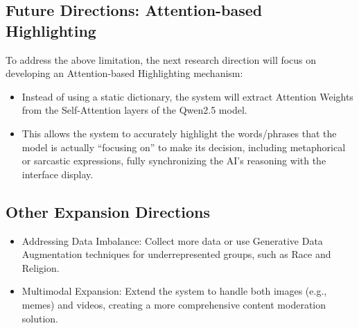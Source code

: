 \documentclass[11pt]{article}
\begin{document}
\subsection{Future Directions: Attention-based Highlighting}
To address the above limitation, the next research direction will focus on developing an
Attention-based Highlighting mechanism:
\begin{itemize}[leftmargin=*]
\item Instead of using a static dictionary, the system will extract Attention Weights from the
Self-Attention layers of the Qwen2.5 model.
\item This allows the system to accurately highlight the words/phrases that the model is
actually ``focusing on'' to make its decision, including metaphorical or sarcastic
expressions, fully synchronizing the AI's reasoning with the interface display.
\end{itemize}

\subsection{Other Expansion Directions}
\begin{itemize}[leftmargin=*]
\item Addressing Data Imbalance: Collect more data or use Generative Data
Augmentation techniques for underrepresented groups, such as Race and Religion.
\item Multimodal Expansion: Extend the system to handle both images (e.g., memes) and
videos, creating a more comprehensive content moderation solution.
\end{itemize}
 

\end{document}
